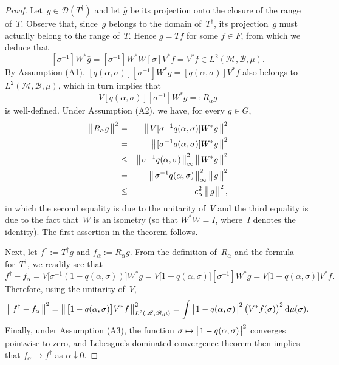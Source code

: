 \documentclass[10pt,a4paper]{amsart}
\def\B{\mathscr{B}}
\def\D{\mathscr{D}}
\def\M{\mathscr{M}}
\def\modc#1{
    \left|
    \mskip 2mu #1 \vphan \mskip 2mu
    \right|
    }
\def\normc#1{
    \left\|
    \mskip 2mu #1 \vphan \mskip 2mu
    \right\|
    }
\def\ud{\,\mathrm{d}}
\def\vphan{\vphantom{\bigl|}}
\begin{document}
\begin{proof}
Let~$g\in\D(T^\dagger)$ and let $\bar{g}$ be its projection onto the
closure of the range of~$T$. Observe that, since~$g$
belongs to the domain of~$T^\dagger$, its projection~$\bar{g}$
must actually belong to the range of~$T$. Hence $\bar{g}=Tf$
for some $f\in F$, from which we deduce that
$$
[\sigma^{-1}]W^*\bar{g}=
[\sigma^{-1}]W^*W[\sigma]V^*f=
V^*f\in L^2(\M,\B,\mu).
$$
By Assumption (A1), $[q(\alpha,\sigma)][\sigma^{-1}]W^*g=[q(\alpha,\sigma)]V^*f$
also belongs to $L^2(\M,\B,\mu)$, which in turn implies that
$$
V[q(\alpha,\sigma)][\sigma^{-1}]W^*g=:R_\alpha g
$$
is well-defined.
Under Assumption (A2), we have, for every $g\in G$,
\begin{eqnarray*}
\normc{R_\alpha g}^2
&=&
\normc{V[\sigma^{-1}q(\alpha,\sigma)]W^*g}^2\\
&=&
\normc{[\sigma^{-1}q(\alpha,\sigma)]W^*g}^2\\
&\leq&
\normc{\sigma^{-1}q(\alpha,\sigma)}_\infty^2\normc{W^*g}^2\\
&=&
\normc{\sigma^{-1}q(\alpha,\sigma)}_\infty^2\normc{g}^2\\
&\leq&
c_\alpha^2\normc{g}^2,
\end{eqnarray*}
in which the second equality is due to the unitarity of~$V$
and the third equality is due to the fact that~$W$ is an isometry
(so that $W^*W=I$, where~$I$ denotes the identity).
The first assertion in the theorem follows.

Next, let $f^\dagger:= T^\dagger g$ and $f_\alpha:=R_\alpha g$.
From the definition of~$R_\alpha$ and the formula for~$T^\dagger$,
we readily see that
$$
f^\dagger-f_\alpha=
V\big[\sigma^{-1}(1-q(\alpha,\sigma))\big]W^*g=
V\big[1-q(\alpha,\sigma)\big][\sigma^{-1}]W^*\bar{g}=
V\big[1-q(\alpha,\sigma)\big]V^*f.
$$
Therefore, using the unitarity of~$V$, 
$$
\normc{f^\dagger-f_\alpha}^2=
\normc{\big[1-q(\alpha,\sigma)\big]V^*f}_{L^2(\M,\B,\mu)}^2=
\int\modc{1-q(\alpha,\sigma)}^2 \big(V^*f(\sigma)\big)^2\ud\mu(\sigma).
$$
Finally, under Assumption (A3), the function
$\sigma\mapsto \modc{1-q(\alpha,\sigma)}^2$ converges pointwise
to zero, and Lebesgue's dominated convergence theorem then implies
that $f_\alpha\to f^\dagger$ as $\alpha\downarrow 0$.
\end{proof}
\end{document}
